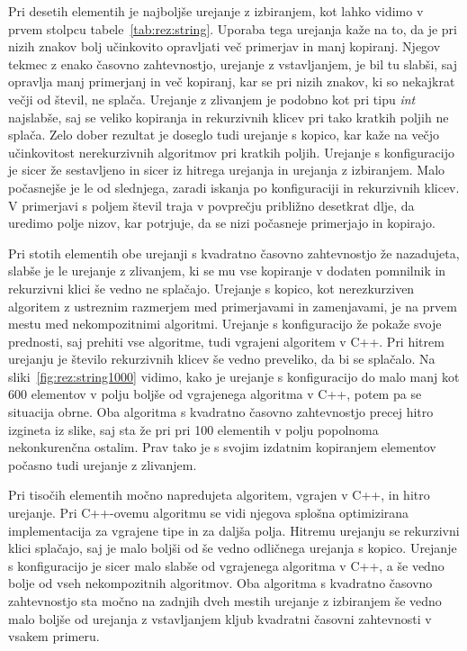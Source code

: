 \documentclass[a4paper,oneside,12pt]{article}
\begin{document}
Pri desetih elementih je najboljše urejanje z izbiranjem, kot lahko vidimo v
prvem stolpcu tabele~\ref{tab:rez:string}.
Uporaba tega urejanja kaže na to, da je pri nizih znakov bolj učinkovito opravljati več
primerjav in manj kopiranj. Njegov tekmec z enako časovno zahtevnostjo, urejanje z 
vstavljanjem, je bil tu slabši, saj opravlja manj primerjanj in več kopiranj, kar se pri
nizih znakov, ki so nekajkrat večji od števil, ne splača. Urejanje z zlivanjem je podobno
kot pri tipu \emph{int} najslabše, saj se veliko kopiranja in rekurzivnih klicev pri tako 
kratkih poljih ne splača. Zelo dober rezultat je doseglo tudi urejanje s kopico, kar kaže 
na večjo učinkovitost nerekurzivnih algoritmov pri kratkih poljih. Urejanje s konfiguracijo
je sicer že sestavljeno in sicer iz hitrega urejanja in urejanja z izbiranjem. Malo počasnejše 
je le od slednjega, zaradi iskanja po konfiguraciji in rekurzivnih klicev.
V primerjavi s poljem števil traja v povprečju približno desetkrat dlje, da uredimo polje nizov,
kar potrjuje, da se nizi počasneje primerjajo in kopirajo.

Pri stotih elementih obe urejanji s kvadratno časovno zahtevnostjo že nazadujeta, slabše je le urejanje z zlivanjem,
ki se mu vse kopiranje v dodaten pomnilnik in rekurzivni klici 
še vedno ne splačajo. Urejanje s kopico, kot nerezkurziven algoritem
z ustreznim razmerjem med primerjavami in zamenjavami, je na prvem mestu med nekompozitnimi algoritmi.
Urejanje s konfiguracijo že pokaže svoje prednosti, saj prehiti vse algoritme, tudi vgrajeni 
algoritem v C++. Pri hitrem urejanju je število rekurzivnih klicev še vedno preveliko, da bi se splačalo.
Na sliki~\ref{fig:rez:string1000} vidimo, kako je urejanje s konfiguracijo do
malo manj kot 600 elementov v polju boljše od vgrajenega algoritma v C++, potem
pa se situacija obrne. Oba algoritma s kvadratno časovno zahtevnostjo precej
hitro izgineta iz slike, saj sta že pri pri 100 elementih v polju popolnoma
nekonkurenčna ostalim. Prav tako je s svojim izdatnim kopiranjem elementov
počasno tudi urejanje z zlivanjem.

Pri tisočih elementih močno napredujeta algoritem, vgrajen v C++, in hitro urejanje. Pri C++-ovemu algoritmu
se vidi njegova splošna optimizirana implementacija za vgrajene tipe in za daljša polja. Hitremu urejanju se 
rekurzivni klici splačajo, saj je malo boljši od še vedno odličnega urejanja s kopico. Urejanje s konfiguracijo 
je sicer malo slabše od vgrajenega algoritma v C++, a še vedno bolje od vseh nekompozitnih algoritmov.
Oba algoritma s kvadratno časovno zahtevnostjo sta močno na zadnjih dveh mestih urejanje z izbiranjem 
še vedno malo boljše od urejanja z vstavljanjem kljub kvadratni časovni zahtevnosti v vsakem primeru.
\end{document}
